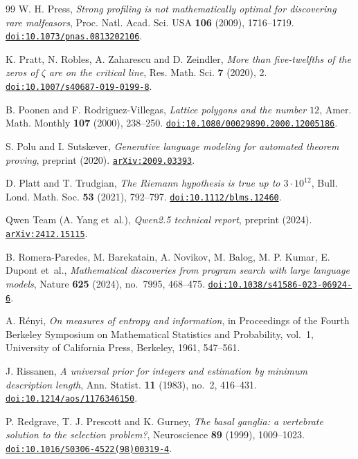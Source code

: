\begin{thebibliography}{99}
W. H. Press,
\emph{Strong profiling is not mathematically optimal for discovering rare malfeasors},
Proc. Natl. Acad. Sci. USA \textbf{106} (2009), 1716--1719.
\href{https://doi.org/10.1073/pnas.0813202106}{\nolinkurl{doi:10.1073/pnas.0813202106}}.

K. Pratt, N. Robles, A. Zaharescu and D. Zeindler,
\emph{More than five-twelfths of the zeros of $\zeta$ are on the critical line},
Res. Math. Sci. \textbf{7} (2020), 2.
\href{https://doi.org/10.1007/s40687-019-0199-8}{\nolinkurl{doi:10.1007/s40687-019-0199-8}}.

B. Poonen and F. Rodriguez-Villegas,
\emph{Lattice polygons and the number $12$},
Amer. Math. Monthly \textbf{107} (2000), 238--250.
\href{https://doi.org/10.1080/00029890.2000.12005186}{\nolinkurl{doi:10.1080/00029890.2000.12005186}}.

S. Polu and I. Sutskever,
\emph{Generative language modeling for automated theorem proving},
preprint (2020).
\href{https://arxiv.org/abs/2009.03393}{\nolinkurl{arXiv:2009.03393}}.

D. Platt and T. Trudgian,
\emph{The Riemann hypothesis is true up to $3\cdot10^{12}$},
Bull. Lond. Math. Soc. \textbf{53} (2021), 792--797.
\href{https://doi.org/10.1112/blms.12460}{\nolinkurl{doi:10.1112/blms.12460}}.

Qwen Team (A. Yang et~al.),
\emph{Qwen2.5 technical report},
preprint (2024).
\href{https://arxiv.org/abs/2412.15115}{\nolinkurl{arXiv:2412.15115}}.

B. Romera-Paredes, M. Barekatain, A. Novikov, M. Balog, M. P. Kumar, E. Dupont et~al.,
\emph{Mathematical discoveries from program search with large language models},
Nature \textbf{625} (2024), no.~7995, 468--475.
\href{https://doi.org/10.1038/s41586-023-06924-6}{\nolinkurl{doi:10.1038/s41586-023-06924-6}}.

A. R\'enyi,
\emph{On measures of entropy and information},
in Proceedings of the Fourth Berkeley Symposium on Mathematical Statistics and Probability, vol.~1, University of California Press, Berkeley, 1961, 547--561.

J. Rissanen,
\emph{A universal prior for integers and estimation by minimum description length},
Ann. Statist. \textbf{11} (1983), no.~2, 416--431.
\href{https://doi.org/10.1214/aos/1176346150}{\nolinkurl{doi:10.1214/aos/1176346150}}.

P. Redgrave, T. J. Prescott and K. Gurney,
\emph{The basal ganglia: a vertebrate solution to the selection problem?},
Neuroscience \textbf{89} (1999), 1009--1023.
\href{https://doi.org/10.1016/S0306-4522(98)00319-4}{\nolinkurl{doi:10.1016/S0306-4522(98)00319-4}}.


\end{thebibliography}
